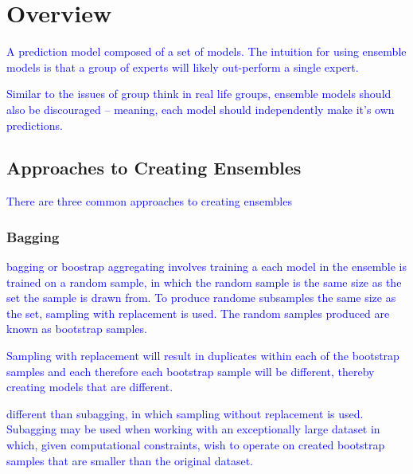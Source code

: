 \section{Overview}


\textcolor{blue}{A prediction model composed of a set of models. The intuition for using ensemble models is that a group of experts will likely out-perform a single expert.}

\textcolor{blue}{Similar to the issues of group think in real life groups, ensemble models should also be discouraged -- meaning, each model should independently make it's own predictions.}


\subsection{Approaches to Creating Ensembles}

\textcolor{blue}{There are three common approaches to creating ensembles}

\subsubsection{Bagging}

\textcolor{blue}{{bagging} or {boostrap aggregating} involves training a each model in the ensemble is trained on a random sample, in which the random sample is the same size as the set the sample is drawn from. To produce randome subsamples the same size as the set, {sampling with replacement} is used. The random samples produced are known as {bootstrap samples}.}

\textcolor{blue}{Sampling with replacement will result in duplicates within each of the bootstrap samples and each therefore each bootstrap sample will be different, thereby creating models that are different.}

\textcolor{blue}{different than subagging, in which {sampling without replacement} is used. Subagging may be used when working with an exceptionally large dataset in which, given computational constraints, wish to operate on created bootstrap samples that are smaller than the original dataset.}

